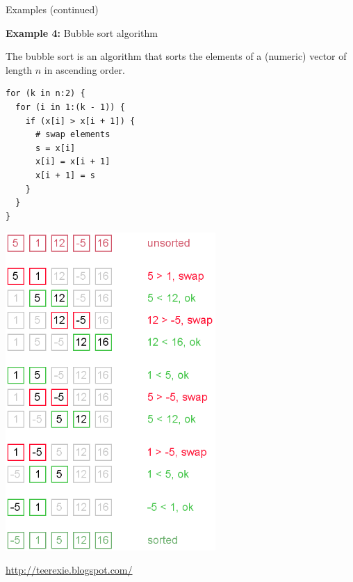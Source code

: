 \documentclass[11pt,compress,t,notes=noshow, xcolor=table]{beamer}
\begin{document}
\begin{vbframe}{Examples (continued)}

\textbf{Example 4: } Bubble sort algorithm

\vspace*{0.2cm}

The bubble sort is an algorithm that sorts the elements of a (numeric) vector of length $n$ in ascending order.

\vspace*{0.4cm}

\begin{minipage}{.45\textwidth}
\begin{footnotesize}
\begin{verbatim}
for (k in n:2) {
  for (i in 1:(k - 1)) {
    if (x[i] > x[i + 1]) {
      # swap elements
      s = x[i]
      x[i] = x[i + 1]
      x[i + 1] = s
    }
  }
}
\end{verbatim}
\end{footnotesize}
\end{minipage}\hfill
\begin{minipage}{.45\textwidth}
\includegraphics[width= 0.6\textwidth]{figure_man/bubble-sort-1.png}\\
\begin{footnotesize}
\url{http://teerexie.blogspot.com/}
\end{footnotesize}

\end{minipage}


\end{vbframe}
\end{document}
